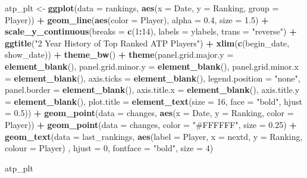 \documentclass[]{book}
\newenvironment{Shaded}{\begin{snugshade}}{\end{snugshade}}
\newcommand{\DataTypeTok}[1]{\textcolor[rgb]{0.13,0.29,0.53}{#1}}
\newcommand{\DecValTok}[1]{\textcolor[rgb]{0.00,0.00,0.81}{#1}}
\newcommand{\FloatTok}[1]{\textcolor[rgb]{0.00,0.00,0.81}{#1}}
\newcommand{\KeywordTok}[1]{\textcolor[rgb]{0.13,0.29,0.53}{\textbf{#1}}}
\newcommand{\NormalTok}[1]{#1}
\newcommand{\OperatorTok}[1]{\textcolor[rgb]{0.81,0.36,0.00}{\textbf{#1}}}
\newcommand{\StringTok}[1]{\textcolor[rgb]{0.31,0.60,0.02}{#1}}
\begin{document}
\begin{Shaded}
\begin{Highlighting}[]
\NormalTok{atp_plt <-}\StringTok{ }\KeywordTok{ggplot}\NormalTok{(}\DataTypeTok{data =}\NormalTok{ rankings, }\KeywordTok{aes}\NormalTok{(}\DataTypeTok{x =}\NormalTok{ Date, }\DataTypeTok{y =}\NormalTok{ Ranking, }\DataTypeTok{group =}\NormalTok{ Player)) }\OperatorTok{+}\StringTok{ }
\StringTok{  }\KeywordTok{geom_line}\NormalTok{(}\KeywordTok{aes}\NormalTok{(}\DataTypeTok{color =}\NormalTok{ Player), }\DataTypeTok{alpha =} \FloatTok{0.4}\NormalTok{, }\DataTypeTok{size =} \FloatTok{1.5}\NormalTok{) }\OperatorTok{+}
\StringTok{  }\KeywordTok{scale_y_continuous}\NormalTok{(}\DataTypeTok{breaks =} \KeywordTok{c}\NormalTok{(}\DecValTok{1}\OperatorTok{:}\DecValTok{14}\NormalTok{), }\DataTypeTok{labels =}\NormalTok{ ylabels, }\DataTypeTok{trans =} \StringTok{"reverse"}\NormalTok{) }\OperatorTok{+}\StringTok{ }
\StringTok{  }\KeywordTok{ggtitle}\NormalTok{(}\StringTok{"2 Year History of Top Ranked ATP Players"}\NormalTok{) }\OperatorTok{+}\StringTok{ }
\StringTok{  }\KeywordTok{xlim}\NormalTok{(}\KeywordTok{c}\NormalTok{(begin_date, show_date)) }\OperatorTok{+}
\StringTok{  }\KeywordTok{theme_bw}\NormalTok{() }\OperatorTok{+}\StringTok{ }
\StringTok{  }\KeywordTok{theme}\NormalTok{(}\DataTypeTok{panel.grid.major.y =} \KeywordTok{element_blank}\NormalTok{(), }\DataTypeTok{panel.grid.minor.y =} \KeywordTok{element_blank}\NormalTok{(),}
        \DataTypeTok{panel.grid.minor.x =} \KeywordTok{element_blank}\NormalTok{(), }\DataTypeTok{axis.ticks =} \KeywordTok{element_blank}\NormalTok{(), }
        \DataTypeTok{legend.position =} \StringTok{"none"}\NormalTok{, }\DataTypeTok{panel.border =} \KeywordTok{element_blank}\NormalTok{(),}
        \DataTypeTok{axis.title.x =} \KeywordTok{element_blank}\NormalTok{(), }\DataTypeTok{axis.title.y =} \KeywordTok{element_blank}\NormalTok{(),}
        \DataTypeTok{plot.title =} \KeywordTok{element_text}\NormalTok{(}\DataTypeTok{size =} \DecValTok{16}\NormalTok{, }\DataTypeTok{face =} \StringTok{"bold"}\NormalTok{, }\DataTypeTok{hjust =} \FloatTok{0.5}\NormalTok{)) }\OperatorTok{+}\StringTok{ }
\StringTok{  }\KeywordTok{geom_point}\NormalTok{(}\DataTypeTok{data =}\NormalTok{ changes, }\KeywordTok{aes}\NormalTok{(}\DataTypeTok{x =}\NormalTok{ Date, }\DataTypeTok{y =}\NormalTok{ Ranking, }\DataTypeTok{color =}\NormalTok{ Player)) }\OperatorTok{+}
\StringTok{  }\KeywordTok{geom_point}\NormalTok{(}\DataTypeTok{data =}\NormalTok{ changes, }\DataTypeTok{color =} \StringTok{"#FFFFFF"}\NormalTok{, }\DataTypeTok{size =} \FloatTok{0.25}\NormalTok{) }\OperatorTok{+}\StringTok{ }
\StringTok{  }\KeywordTok{geom_text}\NormalTok{(}\DataTypeTok{data =}\NormalTok{ last_rankings,}
            \KeywordTok{aes}\NormalTok{(}\DataTypeTok{label =}\NormalTok{ Player, }\DataTypeTok{x =}\NormalTok{ nextd, }\DataTypeTok{y =}\NormalTok{ Ranking, }\DataTypeTok{colour =}\NormalTok{ Player) , }\DataTypeTok{hjust =} \DecValTok{0}\NormalTok{,}
            \DataTypeTok{fontface =} \StringTok{"bold"}\NormalTok{, }\DataTypeTok{size =} \DecValTok{4}\NormalTok{)}

\NormalTok{atp_plt}
\end{Highlighting}
\end{Shaded}
\end{document}
